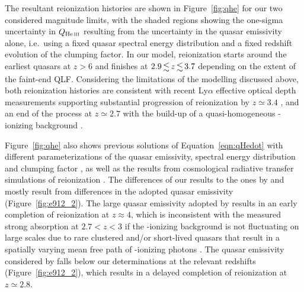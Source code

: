 \documentclass[fleqn,usenatbib]{mnras}
\begin{document}
The resultant  reionization histories are shown in
Figure~\ref{fig:qhe} for our two considered magnitude limits, with the
shaded regions showing the one-sigma uncertainty in $Q_\ion{He}{iii}$
resulting from the uncertainty in the quasar emissivity alone,
i.e.\ using a fixed quasar spectral energy distribution and a fixed
redshift evolution of the clumping factor.  In our model, 
reionization starts around the earliest quasars at $z>6$ and finishes
at $2.9\la z\la 3.7$ depending on the extent of the faint-end QLF.
Considering the limitations of the modelling discussed above, both
 reionization histories are consistent with recent
 Ly$\alpha$ effective optical depth measurements
supporting substantial progression of  reionization by
$z\simeq 3.4$ \citep{2016ApJ...825..144W}, and an end of the process
at $z\simeq 2.7$ \citep{2011ApJ...733L..24W,2016ApJ...825..144W} with
the build-up of a quasi-homogeneous -ionizing background
\citep{2014MNRAS.437.1141D,2017MNRAS.465.2886D}.

Figure~\ref{fig:qhe} also shows previous solutions of
Equation~\eqref{eqn:qHedot} with different parameterizations of the
quasar emissivity, spectral energy distribution and clumping factor
\citep{2012ApJ...746..125H, 2015ApJ...813L...8M, 2016ApJ...828...90L,
  2018arXiv180104931P}, as well as the results from cosmological
radiative transfer simulations of  reionization
\citep{2009ApJ...694..842M,2014MNRAS.445.4186C}.  The differences of
our results to the ones by \citet{2012ApJ...746..125H} and
\citet{2015ApJ...813L...8M} mostly result from differences in the
adopted quasar emissivity (Figure~\ref{fig:e912_2}).  The large quasar
emissivity adopted by \citet{2015ApJ...813L...8M} results in an early
completion of  reionization at $z\approx 4$, which is
inconsistent with the measured strong  absorption at
$2.7<z<3$ \citep{2016ApJ...825..144W, 2018MNRAS.473.1416M,
  2018arXiv180104931P} if the -ionizing background is not
fluctuating on large scales due to rare clustered and/or short-lived
quasars that result in a spatially varying mean free path of
-ionizing photons \citep{2010ApJ...714..355F,
  2014MNRAS.440.2406M, 2014MNRAS.437.1141D, 2017MNRAS.465.2886D}.  The
quasar emissivity considered by \citet{2012ApJ...746..125H} falls
below our determinations at the relevant redshifts
(Figure~\ref{fig:e912_2}), which results in a delayed completion of
 reionization at $z\simeq 2.8$.
\end{document}

